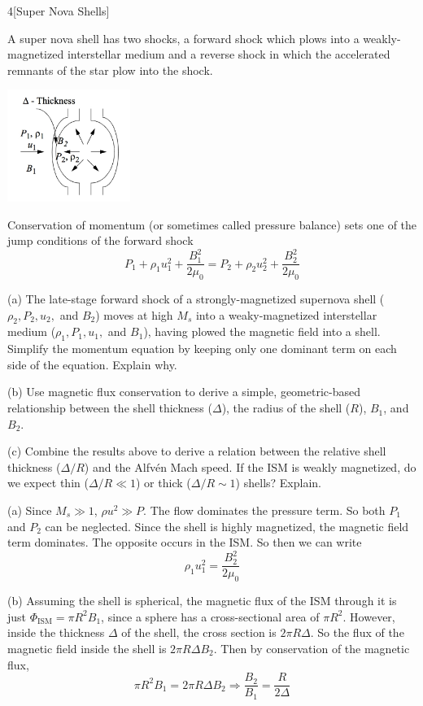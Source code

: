 \documentclass[12pt]{article}
\begin{document}
\begin{problem}{4}[Super Nova Shells]

A super nova shell has two shocks, a forward shock which plows into a
weakly-magnetized interstellar medium and a reverse shock in which the
accelerated remnants of the star plow into the shock. 
\begin{center}
    \includegraphics[width=0.3\textwidth]{hw5_p4.jpg} 
\end{center}
Conservation of momentum
(or sometimes called pressure balance) sets one of the jump conditions of the
forward shock
\begin{equation}
    P_1+\rho_1u_1^2+\frac{B_1^2}{2\mu_0}
    =P_2+\rho_2u_2^2+\frac{B_2^2}{2\mu_0}
\end{equation}

(a) The late-stage forward shock of a strongly-magnetized supernova shell
($\rho_2,P_2,u_2,$ and $B_2$) moves at high $M_s$ into a weaky-magnetized
interstellar medium ($\rho_1,P_1,u_1,$ and $B_1$), having plowed the magnetic
field into a shell. Simplify the momentum equation by keeping only one dominant
term on each side of the equation. Explain why.

(b) Use magnetic flux conservation to derive a simple, geometric-based
relationship between the shell thickness ($\Delta$), the radius of the shell
($R$), $B_1$, and $B_2$.

(c) Combine the results above to derive a relation between the relative shell
thickness ($\Delta / R$) and the Alfvén Mach speed. If the ISM is weakly
magnetized, do we expect thin ($\Delta /R\ll1$) or thick ($\Delta /R\sim 1$)
shells? Explain. 
\begin{solution}
(a) Since $M_s\gg 1$, $\rho u^2\gg P$. The flow dominates the pressure
term. So both $P_1$ and $P_2$ can be neglected. Since the shell is highly
magnetized, the magnetic field term dominates. The opposite occurs in the ISM.
So then we can write
\begin{equation}\label{p4:pressure}
    \rho_1u_1^2=\frac{B_2^2}{2\mu_0} 
\end{equation}

(b) Assuming the shell is spherical, the magnetic flux of the ISM through it is 
just $\Phi_\text{ISM}=\pi R^2B_1$, since a sphere has a cross-sectional area of
$\pi R^2$. However, inside the thickness $\Delta$ of the shell, the cross
section is $2\pi R\Delta$. So the flux of the magnetic field inside the
shell is $2\pi R\Delta B_2$. Then by conservation of the magnetic flux,
\begin{equation}\label{p4:flux}
    \pi R^2B_1=2\pi R\Delta B_2\Rightarrow\frac{B_2}{B_1}=\frac{R}{2\Delta} 
\end{equation}


\end{solution}
\end{problem}
\end{document}
